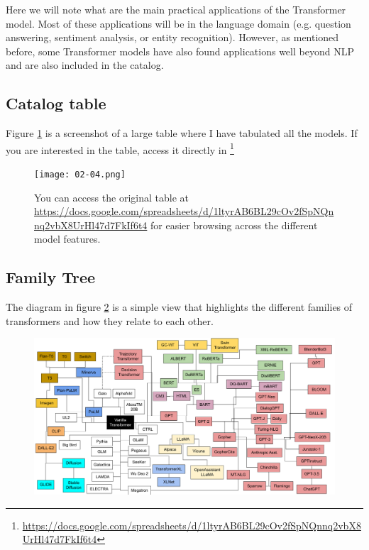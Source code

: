 \documentclass{article}
\begin{document}
Here we will note what are the main practical applications of the Transformer model. Most of these applications will be in the language domain (e.g. question answering, sentiment analysis, or entity recognition). However, as mentioned before, some Transformer models have also found applications well beyond NLP and are also included in the catalog.

\subsection{Catalog table}

Figure \ref{fig:table} is a screenshot of a large table where I have tabulated all the models. If you are interested in the table, access it directly in \footnote{\url{https://docs.google.com/spreadsheets/d/1ltyrAB6BL29cOv2fSpNQnnq2vbX8UrHl47d7FkIf6t4}}

\begin{figure}
    \centering
    \texttt{[image: 02-04.png]}
    \caption{You can access the original table at \url{https://docs.google.com/spreadsheets/d/1ltyrAB6BL29cOv2fSpNQnnq2vbX8UrHl47d7FkIf6t4} for easier browsing across the different model features.}
    \label{fig:table}
\end{figure}

\subsection{Family Tree}

The diagram in figure \ref{fig:tree} is a simple view that highlights the different families of transformers and how they relate to each other.

\begin{figure}
    \centering
    \includegraphics[width=\textwidth,height=\textheight,keepaspectratio]{02-05.png}
    \caption{}
    \label{fig:tree}
\end{figure}
\end{document}
